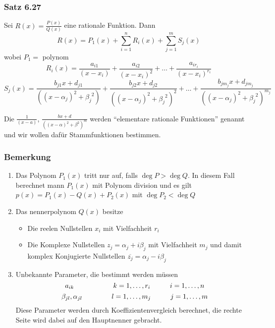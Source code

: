 \subsubsection*{Satz 6.27}
Sei $R(x)=\frac{P(x)}{Q(x)}$ eine rationale Funktion. Dann \[R(x)=P_1(x)+\sum ^{n}_{i=1}R_{i}\left( x\right) +\sum ^{m}_{j=1}S_{j}\left( x\right) \] wobei $P_1=$ polynom \[R_{i}\left( x\right) =\dfrac {a_{i1}}{\left( x-x_{i}\right) }+\dfrac {a_{i2}}{\left( x-x_{i}\right) ^{2}}+\ldots +\dfrac {a_{ir_{i}}}{{\left( x-x_{i}\right)}^{r_i} }\]  \[S_{j}\left( x\right) =\dfrac {b_{j1}x+{d_{j1}}}{\left( \left(x-\alpha_{j}\right)^2+{\beta_{j}}^2\right) }+\dfrac {b_{j2}x+{d_{j2}}}{\left( \left(x-\alpha_{j}\right)^2+{\beta_{j}}^2\right)^2 }+\ldots +\dfrac {b_{j m_j}x+{d_{j m_j}}}{\left( \left(x-\alpha_{j}\right)^2+{\beta_{j}}^2\right)^{m_j} }\]

Die $\frac{1}{(x-a)}$, $\frac{bx+d}{\left( (x-\alpha )^2 +\beta ^2\right)^m}$ werden ``elementare rationale Funktionen'' genannt und wir wollen dafür Stammfunktionen bestimmen.

\subsubsection*{Bemerkung}

\begin{enumerate}
\item Das Polynom $P_1(x)$ tritt nur auf, falls $\deg P>\deg Q$. In diesem Fall berechnet mann $P_1(x)$ mit Polynom division und es gilt $p(x)=P_1(x)-Q(x)+P_2(x)$ mit $\deg P_2 < \deg Q$
\item Das nennerpolynom $Q(x)$ besitze
\begin{itemize}
\item Die reelen Nullstellen $x_i$ mit Vielfachheit $r_i$
\item Die Komplexe Nullstellen $z_j=\alpha _j+i\beta_j$ mit Vielfachheit $m_j$ und damit komplex Konjugierte Nullstellen $\overline{z_j}=\alpha _j-i\beta _j$
\end{itemize}
\item Unbekannte Parameter, die bestimmt werden müssen
\[a_{ik}\text{\hspace{20mm}}k=1,\dots ,r_i\text{\hspace{10mm}}i=1,\dots,n\]
\[\beta _{jl},\alpha _{jl}\text{\hspace{15mm}}l=1,\dots ,m_j\text{\hspace{10mm}}j=1,\dots,m\]
Diese Parameter werden durch Koeffizientenvergleich berechnet, die rechte Seite wird dabei auf den Hauptnenner gebracht.
\end{enumerate}
